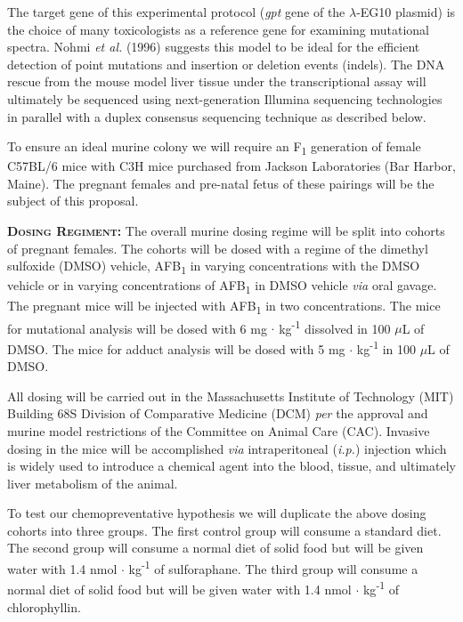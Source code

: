\documentclass[12pt]{article}
\begin{document}
The target gene of this experimental protocol (\emph{gpt} gene of the $\lambda$-EG10 plasmid) is the choice of many toxicologists as a reference gene for examining mutational spectra.
Nohmi \emph{et al.} (1996) suggests this model to be ideal for the efficient detection of point mutations and insertion or deletion events (indels).
The DNA rescue from the mouse model liver tissue under the transcriptional assay will ultimately be sequenced using next-generation Illumina sequencing technologies in parallel with a duplex consensus sequencing technique as described below.

To ensure an ideal murine colony we will require an F\textsubscript{1} generation of female C57BL/6 mice with C3H mice purchased from Jackson Laboratories (Bar Harbor, Maine).
The pregnant females and pre-natal fetus of these pairings will be the subject of this proposal.

\vspace{4mm}\noindent\textbf{\textsc{Dosing Regiment: }}
The overall murine dosing regime will be split into cohorts of pregnant females.
The cohorts will be dosed with a regime of the dimethyl sulfoxide (DMSO) vehicle, AFB\textsubscript{1} in varying concentrations with the DMSO vehicle or in varying concentrations of AFB\textsubscript{1} in DMSO vehicle \emph{via} oral gavage.
The pregnant mice will be injected with AFB\textsubscript{1} in two concentrations.
The mice for mutational analysis will be dosed with 6 mg $\cdot$ kg\textsuperscript{-1} dissolved in 100 $\mu$L of DMSO.
The mice for adduct analysis will be dosed with 5 mg $\cdot$ kg\textsuperscript{-1} in 100 $\mu$L of DMSO.

All dosing will be carried out in the Massachusetts Institute of Technology (MIT) Building 68S Division of Comparative Medicine (DCM) \emph{per} the approval and murine model restrictions of the Committee on Animal Care (CAC).
Invasive dosing in the mice will be accomplished \emph{via} intraperitoneal (\emph{i.p.}) injection which is widely used to introduce a chemical agent into the blood, tissue, and ultimately liver metabolism of the animal.

To test our chemopreventative hypothesis we will duplicate the above dosing cohorts into three groups. The first control group will consume a standard diet.
The second group will consume a normal diet of solid food but will be given water with 1.4 nmol $\cdot$ kg\textsuperscript{-1} of sulforaphane.
The third group will consume a normal diet of solid food but will be given water with 1.4 nmol $\cdot$ kg\textsuperscript{-1} of chlorophyllin.
\end{document}
